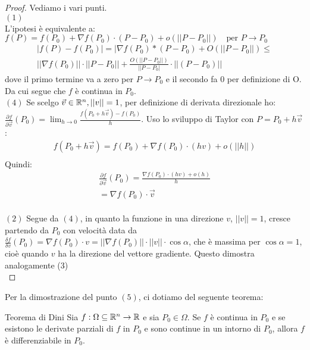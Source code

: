\begin{proof}
  Vediamo i vari punti.\\
  $(1)$\\
  L'ipotesi è equivalente a:
  $f(P)=f(P_0)+\nabla f(P_0)\cdot (P-P_0)+o(||P-P_0||) \quad \text{per } P \rightarrow P_0$\\
  \begin{gather*}
 |f(P) - f(P_0)|= |\nabla f(P_0)*(P-P_0)+O(||P-P_0||)\leq\\||\nabla f(P_0) ||\cdot|| P-P_0||+\frac{O(||P-P_0||)}{||P-P_0|}\cdot ||(P-P_0)||
  \end{gather*}
  dove il primo termine va a zero per $P\rightarrow P_0$ e il secondo fa 0 per definizione di O. Da cui segue che $f$ è continua in $P_0$.\\
  \newline
  $(4)$
  Se scelgo $\vec{v}\in \mathbb{R}^n, ||v||=1$, per definizione di derivata direzionale ho: $\frac{\partial f}{\partial \vec{v}}(P_0) = \lim_{h \to 0} \frac{f(P_0 + h\vec{v}) - f(P_0)}{h}$. Uso lo sviluppo di Taylor con  $P=P_0 + h\vec{v}$:
  \begin{gather*}
  f(P_0 + h\vec{v}) = f(P_0) + \nabla f(P_0)\cdot (hv) + o(||h||)\\
  \end{gather*}
  Quindi:
  \begin{gather*}
  \frac{\partial f}{\partial \vec{v}}(P_0)=\frac {\nabla f(P_0)\cdot (hv)+ o(h)}{h}\\=\nabla f(P_0)\cdot \vec{v}
  \end{gather*}\\
  \newline
  $(2)$ Segue da $(4)$, in quanto la funzione in una direzione $v$, $||v||=1$, cresce partendo da $P_0$ con velocità data da $\frac{\delta f}{\delta v}(P_0) = \nabla f(P_0)\cdot v = ||\nabla f(P_0)||\cdot ||v||\cdot \cos{\alpha}$, che è massima per $\cos{\alpha}=1$, cioè quando $v$ ha la direzione del vettore gradiente. Questo dimostra analogamente (3)\\

\end{proof}

Per la dimostrazione del punto $(5)$, ci dotiamo del seguente teorema:

\begin{teorema}{Teorema di Dini}
  Sia $f:\Omega \subseteq \mathbb{R}^n \rightarrow \mathbb{R}$ e sia $P_0 \in \Omega$. Se $f$ è continua in $P_0$ e se esistono le derivate parziali di $f$ in $P_0$ e sono continue in un intorno di $P_0$, allora $f$ è differenziabile in $P_0$.
\end{teorema}

